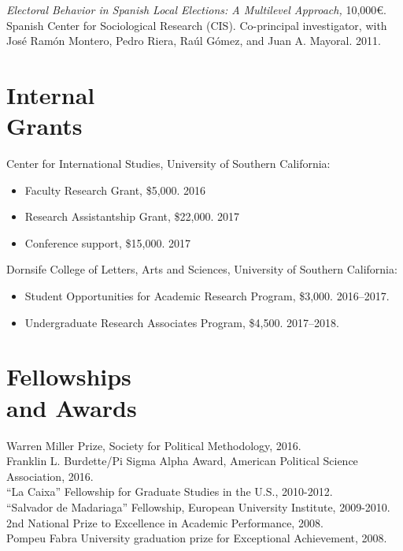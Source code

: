 \documentclass[margin,line,11pt]{resume}
\newcommand{\nl}{\vspace{0.10in}\\}
\begin{document}
\begin{resume}
    \textit{Electoral Behavior in Spanish Local Elections: A Multilevel Approach,} 10,000\euro. Spanish Center for Sociological Research (CIS). Co-principal investigator, with Jos\'{e} Ram\'{o}n Montero, Pedro Riera, Ra\'{u}l G\'{o}mez, and Juan A. Mayoral. 2011.    


        \section{\mysidestyle Internal\\Grants}

Center for International Studies, University of Southern California:
\begin{itemize}
\item[] Faculty Research Grant, \$5,000. 2016
\vspace{-.15cm}
\item[] Research Assistantship Grant, \$22,000. 2017
\vspace{-.15cm}
\item[] Conference support, \$15,000. 2017
\end{itemize}
Dornsife College of Letters, Arts and Sciences, University of Southern California:
\begin{itemize}
\item[] Student Opportunities for Academic Research Program, \$3,000. 2016--2017.
\vspace{-.15cm}
\item[] Undergraduate Research Associates Program, \$4,500. 2017--2018.
\end{itemize}
 


    \section{\mysidestyle Fellowships\\ and Awards}
	Warren Miller Prize, Society for Political Methodology, 2016.\nl
    Franklin L. Burdette/Pi Sigma Alpha Award, American Political Science Association, 2016.\nl
	``La Caixa'' Fellowship for Graduate Studies in the U.S., 2010-2012. \nl
	``Salvador de Madariaga'' Fellowship, European University Institute, 2009-2010. \nl
	 2nd National Prize to Excellence in Academic Performance, 2008. \nl
	Pompeu Fabra University graduation prize for Exceptional Achievement, 2008.


\end{resume}
\end{document}
